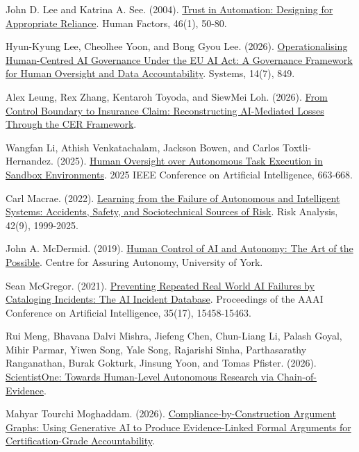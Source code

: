 \documentclass[11pt]{article}
\newenvironment{TAEReferences}{%
  \begin{list}{}{%
    \renewcommand{\makelabel}[1]{}%
    \setlength{\labelwidth}{0pt}%
    \setlength{\labelsep}{0pt}%
    \setlength{\leftmargin}{0.5in}%
    \setlength{\itemindent}{-0.5in}%
    \setlength{\itemsep}{0.45em}%
    \setlength{\parsep}{0pt}%
    \setlength{\topsep}{0.25em}%
  }%
}{\end{list}}
\begin{document}
\begin{TAEReferences}
\item{}\label{reference-25} John D. Lee and Katrina A. See. (2004). \href{https://doi.org/10.1518/hfes.46.1.50_30392}{Trust in Automation: Designing for Appropriate Reliance}. Human Factors, 46(1), 50-80.
\item{}\label{reference-26} Hyun-Kyung Lee, Cheolhee Yoon, and Bong Gyou Lee. (2026). \href{https://doi.org/10.3390/systems14070849}{Operationalising Human-Centred AI Governance Under the EU AI Act: A Governance Framework for Human Oversight and Data Accountability}. Systems, 14(7), 849.
\item{}\label{reference-27} Alex Leung, Rex Zhang, Kentaroh Toyoda, and SiewMei Loh. (2026). \href{https://arxiv.org/abs/2606.03777}{From Control Boundary to Insurance Claim: Reconstructing AI-Mediated Losses Through the CER Framework}.
\item{}\label{reference-28} Wangfan Li, Athish Venkatachalam, Jackson Bowen, and Carlos Toxtli-Hernandez. (2025). \href{https://doi.org/10.1109/CAI64502.2025.00121}{Human Oversight over Autonomous Task Execution in Sandbox Environments}. 2025 IEEE Conference on Artificial Intelligence, 663-668.
\item{}\label{reference-29} Carl Macrae. (2022). \href{https://doi.org/10.1111/risa.13850}{Learning from the Failure of Autonomous and Intelligent Systems: Accidents, Safety, and Sociotechnical Sources of Risk}. Risk Analysis, 42(9), 1999-2025.
\item{}\label{reference-30} John A. McDermid. (2019). \href{https://www.york.ac.uk/assuring-autonomy/news/blog/human-control-ai-autonomy/}{Human Control of AI and Autonomy: The Art of the Possible}. Centre for Assuring Autonomy, University of York.
\item{}\label{reference-31} Sean McGregor. (2021). \href{https://doi.org/10.1609/aaai.v35i17.17817}{Preventing Repeated Real World AI Failures by Cataloging Incidents: The AI Incident Database}. Proceedings of the AAAI Conference on Artificial Intelligence, 35(17), 15458-15463.
\item{}\label{reference-32} Rui Meng, Bhavana Dalvi Mishra, Jiefeng Chen, Chun-Liang Li, Palash Goyal, Mihir Parmar, Yiwen Song, Yale Song, Rajarishi Sinha, Parthasarathy Ranganathan, Burak Gokturk, Jinsung Yoon, and Tomas Pfister. (2026). \href{https://doi.org/10.48550/arXiv.2605.26340}{ScientistOne: Towards Human-Level Autonomous Research via Chain-of-Evidence}.
\item{}\label{reference-33} Mahyar Tourchi Moghaddam. (2026). \href{https://doi.org/10.48550/arXiv.2604.04103}{Compliance-by-Construction Argument Graphs: Using Generative AI to Produce Evidence-Linked Formal Arguments for Certification-Grade Accountability}.

\end{TAEReferences}
\end{document}
